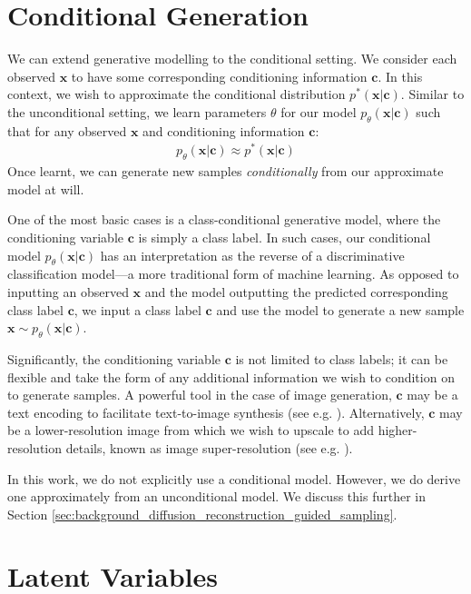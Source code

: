 \documentclass[ oneside,%
                    author={George Herbert},
                    degree={MSci},
                     title={Video Diffusion Models for Climate Simulations},
                  subtitle={}]{dissertation}
\begin{document}
\section{Conditional Generation}
\label{sec:background_conditional}

We can extend generative modelling to the conditional setting. We consider each observed $\mathbf{x}$ to have some corresponding conditioning information $\mathbf{c}$. In this context, we wish to approximate the conditional distribution $p^*(\mathbf{x}|\mathbf{c})$. Similar to the unconditional setting, we learn parameters $\theta$ for our model $p_\theta(\mathbf{x}|\mathbf{c})$ such that for any observed $\mathbf{x}$ and conditioning information $\mathbf{c}$:
\begin{align}
      p_\theta(\mathbf{x}|\mathbf{c})\approx p^*(\mathbf{x}|\mathbf{c})
\end{align}
Once learnt, we can generate new samples \textit{conditionally} from our approximate model at will.

One of the most basic cases is a class-conditional generative model, where the conditioning variable $\mathbf{c}$ is simply a class label. In such cases, our conditional model $p_\theta(\mathbf{x}|\mathbf{c})$ has an interpretation as the reverse of a discriminative classification model---a more traditional form of machine learning. As opposed to inputting an observed $\mathbf{x}$ and the model outputting the predicted corresponding class label $\mathbf{c}$, we input a class label $\mathbf{c}$ and use the model to generate a new sample $\mathbf{x}\sim p_\theta(\mathbf{x}|\mathbf{c})$.

Significantly, the conditioning variable $\mathbf{c}$ is not limited to class labels; it can be flexible and take the form of any additional information we wish to condition on to generate samples. A powerful tool in the case of image generation, $\mathbf{c}$ may be a text encoding to facilitate text-to-image synthesis (see e.g. \cite{Imagen_Saharia,Simple_Diffusion_Hoogeboom}). Alternatively, $\mathbf{c}$ may be a lower-resolution image from which we wish to upscale to add higher-resolution details, known as image super-resolution (see e.g. \cite{Cascaded_Ho}).

In this work, we do not explicitly use a conditional model. However, we do derive one approximately from an unconditional model. We discuss this further in Section \ref{sec:background_diffusion_reconstruction_guided_sampling}.

\section{Latent Variables}
\label{sec:background_latent}
\end{document}

